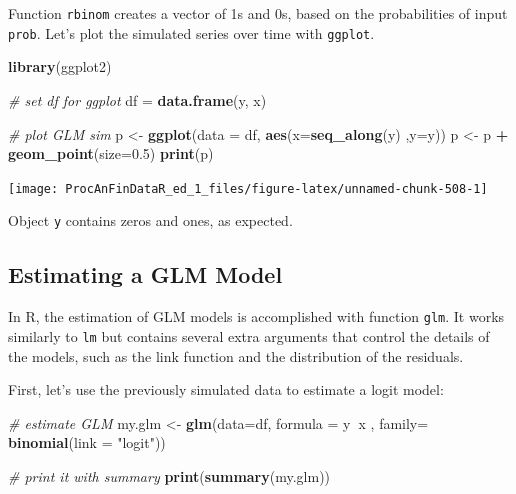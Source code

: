 \documentclass[11pt,]{book}
\newenvironment{Shaded}{\begin{snugshade}}{\end{snugshade}}
\newcommand{\KeywordTok}[1]{\textcolor[rgb]{0.27,0.27,0.27}{\textbf{#1}}}
\newcommand{\DataTypeTok}[1]{\textcolor[rgb]{0.27,0.27,0.27}{#1}}
\newcommand{\FloatTok}[1]{\textcolor[rgb]{0.06,0.06,0.06}{#1}}
\newcommand{\StringTok}[1]{\textcolor[rgb]{0.5,0.5,0.5}{#1}}
\newcommand{\CommentTok}[1]{\textcolor[rgb]{0.56,0.35,0.01}{\textit{#1}}}
\newcommand{\OperatorTok}[1]{\textcolor[rgb]{0.81,0.36,0.00}{\textbf{#1}}}
\newcommand{\NormalTok}[1]{#1}
\begin{document}
Function \texttt{rbinom} creates a vector of 1s and 0s, based on the
probabilities of input \texttt{prob}. Let's plot the simulated series
over time with \texttt{ggplot}.

\begin{Shaded}
\begin{Highlighting}[]
\KeywordTok{library}\NormalTok{(ggplot2)}

\CommentTok{# set df for ggplot}
\NormalTok{df =}\StringTok{ }\KeywordTok{data.frame}\NormalTok{(y, x)}

\CommentTok{# plot GLM sim}
\NormalTok{p <-}\StringTok{ }\KeywordTok{ggplot}\NormalTok{(}\DataTypeTok{data =}\NormalTok{ df, }\KeywordTok{aes}\NormalTok{(}\DataTypeTok{x=}\KeywordTok{seq_along}\NormalTok{(y) ,}\DataTypeTok{y=}\NormalTok{y))}
\NormalTok{p <-}\StringTok{ }\NormalTok{p }\OperatorTok{+}\StringTok{ }\KeywordTok{geom_point}\NormalTok{(}\DataTypeTok{size=}\FloatTok{0.5}\NormalTok{)}
\KeywordTok{print}\NormalTok{(p)}
\end{Highlighting}
\end{Shaded}

\begin{center}\texttt{[image: ProcAnFinDataR\_ed\_1\_files/figure-latex/unnamed-chunk-508-1]} \end{center}

Object \texttt{y} contains zeros and ones, as expected.

\subsection{Estimating a GLM Model}\label{estimating-a-glm-model}

In R, the estimation of GLM models is accomplished with function
\texttt{glm}. It works similarly to \texttt{lm} but contains several
extra arguments that control the details of the models, such as the link
function and the distribution of the residuals.

First, let's use the previously simulated data to estimate a logit
model:

\begin{Shaded}
\begin{Highlighting}[]
\CommentTok{# estimate GLM}
\NormalTok{my.glm <-}\StringTok{ }\KeywordTok{glm}\NormalTok{(}\DataTypeTok{data=}\NormalTok{df, }
              \DataTypeTok{formula =}\NormalTok{ y}\OperatorTok{~}\NormalTok{x , }
              \DataTypeTok{family=} \KeywordTok{binomial}\NormalTok{(}\DataTypeTok{link =} \StringTok{"logit"}\NormalTok{))}

\CommentTok{# print it with summary}
\KeywordTok{print}\NormalTok{(}\KeywordTok{summary}\NormalTok{(my.glm))}
\end{Highlighting}
\end{Shaded}
\end{document}

